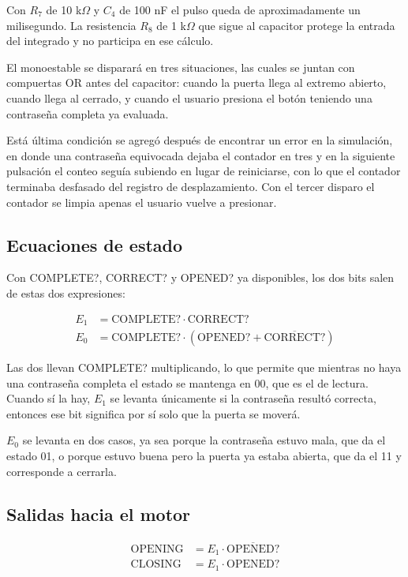 \documentclass[12pt]{article}
\begin{document}
Con $R_7$ de 10 k$\Omega$ y $C_4$ de 100 nF el pulso queda de aproximadamente un
milisegundo. La resistencia $R_8$ de 1 k$\Omega$ que sigue al capacitor protege la
entrada del integrado y no participa en ese cálculo.

El monoestable se disparará en tres situaciones, las cuales se juntan con
compuertas OR antes del capacitor: cuando la puerta llega al extremo abierto,
cuando llega al cerrado, y cuando el usuario presiona el botón teniendo una
contraseña completa ya evaluada.

Está última condición se agregó después de encontrar un error en la simulación, en
donde una contraseña equivocada dejaba el contador en tres y en la siguiente
pulsación el conteo seguía subiendo en lugar de reiniciarse, con lo que el
contador terminaba desfasado del registro de desplazamiento. Con el tercer disparo
el contador se limpia apenas el usuario vuelve a presionar.

\subsection{Ecuaciones de estado}

Con COMPLETE?, CORRECT? y OPENED? ya disponibles, los dos bits salen de estas dos
expresiones:

\begin{align*}
E_1 &= \text{COMPLETE?} \cdot \text{CORRECT?} \\
E_0 &= \text{COMPLETE?} \cdot (\text{OPENED?} + \overline{\text{CORRECT?}})
\end{align*}

Las dos llevan COMPLETE? multiplicando, lo que permite que mientras no haya una
contraseña completa el estado se mantenga en 00, que es el de lectura. Cuando sí
la hay, $E_1$ se levanta únicamente si la contraseña resultó correcta, entonces
ese bit significa por sí solo que la puerta se moverá.

$E_0$ se levanta en dos casos, ya sea porque la contraseña estuvo mala, que da el
estado 01, o porque estuvo buena pero la puerta ya estaba abierta, que da el 11 y
corresponde a cerrarla.

\subsection{Salidas hacia el motor}

\begin{align*}
\text{OPENING} &= E_1 \cdot \overline{\text{OPENED?}} \\
\text{CLOSING} &= E_1 \cdot \text{OPENED?}
\end{align*}
\end{document}
